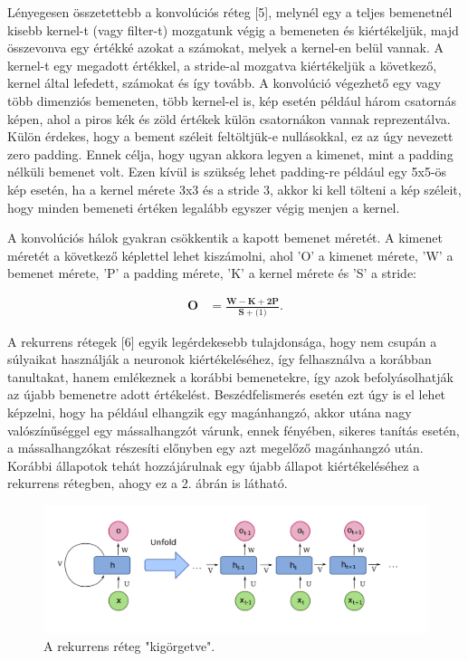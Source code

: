 Lényegesen összetettebb a konvolúciós réteg [5], melynél egy a teljes bemenetnél kisebb kernel-t (vagy filter-t) mozgatunk végig a bemeneten és kiértékeljük, majd összevonva egy értékké azokat a számokat, melyek a kernel-en belül vannak. A kernel-t egy megadott értékkel, a stride-al mozgatva kiértékeljük a következő, kernel által lefedett, számokat és így tovább. A konvolúció végezhető egy vagy több dimenziós bemeneten, több kernel-el is, kép esetén például három csatornás képen, ahol a piros kék és zöld értékek külön csatornákon vannak reprezentálva. Külön érdekes, hogy a bement széleit feltöltjük-e nullásokkal, ez az úgy nevezett zero padding. Ennek célja, hogy ugyan akkora legyen a kimenet, mint a padding nélküli bemenet volt. Ezen kívül is szükség lehet padding-re például egy 5x5-ös kép esetén, ha a kernel mérete 3x3 és a stride 3, akkor ki kell tölteni a kép széleit, hogy minden bemeneti értéken legalább egyszer végig menjen a kernel.

A konvolúciós hálok gyakran csökkentik a kapott bemenet méretét. A kimenet méretét a következő képlettel lehet kiszámolni, ahol ’O’ a kimenet mérete, ’W’ a bemenet mérete, ’P’ a padding mérete, ’K’ a kernel mérete és ’S’ a stride:

\begin{align}
\mathbf{O}&=\frac{\mathbf{W}-\mathbf{K}+\mathbf{2P}}{\mathbf{S}+\mathbf(1)}.
\end{align}

A rekurrens rétegek [6] egyik legérdekesebb tulajdonsága, hogy nem csupán a súlyaikat használják a neuronok kiértékeléséhez, így felhasználva a korábban tanultakat, hanem emlékeznek a korábbi bemenetekre, így azok befolyásolhatják az újabb bemenetre adott értékelést. Beszédfelismerés esetén ezt úgy is el lehet képzelni, hogy ha például elhangzik egy magánhangzó, akkor utána nagy valószínűséggel egy mássalhangzót várunk, ennek fényében, sikeres tanítás esetén, a mássalhangzókat részesíti előnyben egy azt megelőző magánhangzó után. Korábbi állapotok tehát hozzájárulnak egy újabb állapot kiértékeléséhez a rekurrens rétegben, ahogy ez a 2. ábrán is látható.
 
\begin{figure}[!ht]
\centering
\includegraphics[width=150mm, keepaspectratio]{figures/rnn.png}
\caption{A rekurrens réteg "kigörgetve".}
\label{fig:TeXstudio}
\end{figure}

